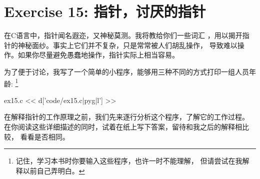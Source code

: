 ﻿\chapter{Exercise 15: 指针，讨厌的指针}

在C语言中，指针闻名遐迩，又神秘莫测。我将教给你们一些词汇
，用以揭开指针的神秘面纱。事实上它们并不复杂，只是常常被人们胡乱操作，
导致难以操作。如果你尽量避免愚蠢地操作，指针实际上相当容易。

为了便于讨论，我写了一个简单的小程序，能够用三种不同的方式打印一组人员年龄:
\footnote{记住，学习本书时你要输入这些程序，也许一时不能理解，
但请尝试在我解释以前自己弄明白。}

\begin{code}{ex15.c}
<< d['code/ex15.c|pyg|l'] >>
\end{code}
在解释指针的工作原理之前，我们先来逐行分析这个程序，了解它的工作过程。
在你阅读这些详细描述的同时，试着在纸上写下答案，留待和我之后的解释相比较，
看看是否相同。

